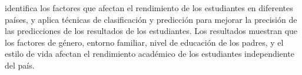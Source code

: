 \textcite{oskouei2014predicting} identifica los factores que afectan el rendimiento de los estudiantes en diferentes países, y aplica técnicas de clasificación y predicción para mejorar la precisión de las predicciones de los resultados de los estudiantes. Los resultados muestran que los factores de género, entorno familiar, nivel de educación de los padres, y el estilo de vida afectan el rendimiento académico de los estudiantes independiente del país.







